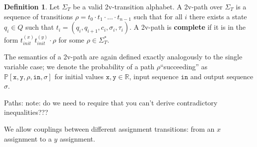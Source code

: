 \documentclass[12pt]{article}
\newcommand{\RR}{\mathbb{R}}
\newcommand{\PP}{\mathbb{P}}
\theoremstyle{definition}
\newtheorem{defn}[thm]{Definition}
\begin{document}
\begin{defn}
    Let $\Sigma_T$ be a valid 2v-transition alphabet. A 2v-path over $\Sigma_T$ is a sequence of transitions $\rho=t_0\cdot t_1\cdot \ldots \cdot t_{n-1}$ such that for all $i$ there exists a state $q_i\in Q$ such that $t_i = (q_i, q_{i+1}, c_i, \sigma_i, \tau_i)$. A 2v-path is \textbf{complete} if it is in the form $t_{init}^{(x)}t_{init}^{(y)}\cdot \rho$ for some $\rho\in \Sigma_T^*$.
\end{defn}

The semantics of a 2v-path are again defined exactly analogously to the single variable case; we denote the probability of a path $\rho$``succeeding'' as $\PP[\texttt{x}, \texttt{y}, \rho, \texttt{in}, \sigma]$ for initial values $\texttt{x}, \texttt{y}\in \RR$, input sequence $\texttt{in}$ and output sequence $\sigma$. 


Paths:
{\color{red} note: do we need to require that you can't derive contradictory inequalities???}

We allow couplings between different assignment transitions: from an $x$ assignment to a $y$ assignment. 
\end{document}
